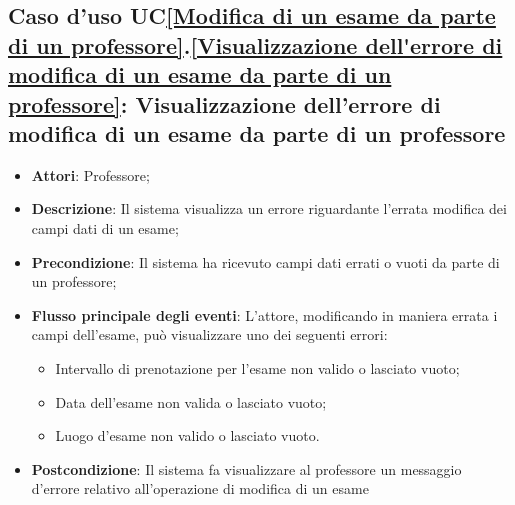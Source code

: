 \subsection{Caso d'uso UC\ref{Modifica di un esame da parte di un professore}.\ref{Visualizzazione dell'errore di modifica di un esame da parte di un professore}: Visualizzazione dell'errore di modifica di un esame da parte di un professore}
\begin{itemize}
	\item \textbf{Attori}: Professore;
	\item \textbf{Descrizione}: Il sistema visualizza un errore riguardante l'errata modifica dei campi dati di un esame;
	\item \textbf{Precondizione}: Il sistema ha ricevuto campi dati errati o vuoti da parte di un professore;
	
	\item \textbf{Flusso principale degli eventi}: L'attore, modificando in maniera errata i campi dell'esame, può visualizzare uno dei seguenti errori: \begin{itemize}
		\item Intervallo di prenotazione per l'esame non valido o lasciato vuoto;
		\item Data dell'esame non valida o lasciato vuoto;
		\item Luogo d'esame non valido o lasciato vuoto.
	\end{itemize}
	\item \textbf{Postcondizione}: Il sistema fa visualizzare al professore un messaggio d'errore relativo all'operazione di modifica di un esame
	
\end{itemize}


